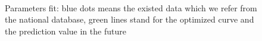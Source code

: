 \begin{figure}[!h]
\begin{center}
    \\
    \end{center}
    \caption{Parameters fit: blue dots means the existed data which we refer from the national database, green lines stand for the optimized curve and the prediction value in the future }
    \label{fig: parameters fit}
    \end{figure}

